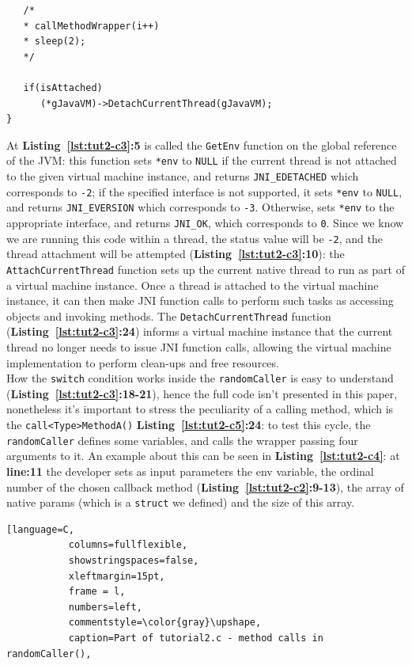 \documentclass[a4paper,10pt]{article}
\newcommand{\keyword}[1]{\texttt{#1}}
\newcommand{\refl}[1]{\textbf{Listing~\ref{#1}}}
\begin{document}
\begin{multicols}{2}
\begin{lstlisting}
   /*
   * callMethodWrapper(i++) 
   * sleep(2);   
   */
   
   if(isAttached)
      (*gJavaVM)->DetachCurrentThread(gJavaVM);
}
\end{lstlisting}
At \refl{lst:tut2-c3}\textbf{:5} is called the \keyword{GetEnv} function on the
global reference of the JVM: this function sets \keyword{*env} to \keyword{NULL}
if the current thread is not attached to the given virtual machine instance, and
returns \keyword{JNI\_EDETACHED} which corresponds to \keyword{-2}; if the
specified interface is not supported, it sets \keyword{*env} to \keyword{NULL},
and returns \keyword{JNI\_EVERSION} which corresponds to \keyword{-3}. Otherwise,
sets \keyword{*env} to the appropriate interface, and returns \keyword{JNI\_OK},
which corresponds to \keyword{0}. Since we know we are running this code within
a thread, the status value will be \keyword{-2}, and the thread attachment will
be attempted (\refl{lst:tut2-c3}\textbf{:10}): the \keyword{AttachCurrentThread}
function sets up the current native thread to run as part of a virtual machine
instance. Once a thread is attached to the virtual machine instance, it can then
make JNI function calls to perform such tasks as accessing objects and invoking
methods. The \keyword{DetachCurrentThread} function
(\refl{lst:tut2-c3}\textbf{:24}) informs a virtual machine instance that the
current thread no longer needs to issue JNI function calls, allowing the virtual
machine implementation to perform clean-ups and free resources.\\
How the \keyword{switch} condition works inside the \keyword{randomCaller} is
easy to understand (\refl{lst:tut2-c3}\textbf{:18-21}), hence the full code
isn't presented in this paper, nonetheless it's important to stress the
peculiarity of a calling method, which is the \keyword{call<Type>MethodA()}
\refl{lst:tut2-c5}\textbf{:24}: to test this cycle, the \keyword{randomCaller}
defines some variables, and calls the wrapper passing four arguments to it. An
example about this can be seen in \refl{lst:tut2-c4}: at \textbf{line:11} the
developer sets as input parameters the env variable, the ordinal number of the
chosen callback method (\refl{lst:tut2-c2}\textbf{:9-13}), the array of native
params (which is a \keyword{struct} we defined) and the size of this array.
\begin{lstlisting}[language=C,
		   columns=fullflexible,
		   showstringspaces=false,
		   xleftmargin=15pt,
		   frame = l,
		   numbers=left,
		   commentstyle=\color{gray}\upshape,
		   caption=Part of tutorial2.c - method calls in randomCaller(),

\end{lstlisting}
\end{multicols}
\end{document}
